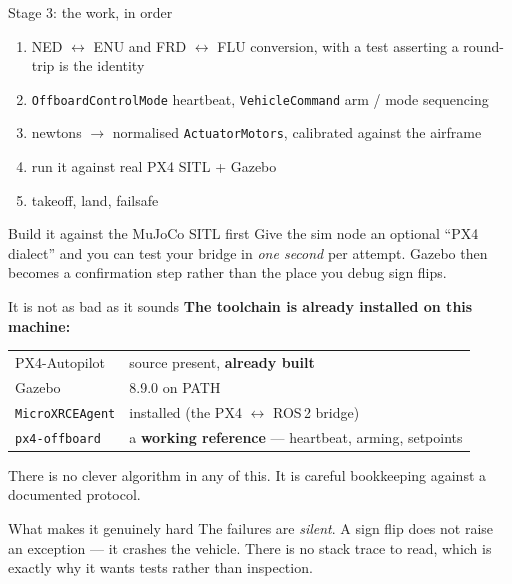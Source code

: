 \documentclass[aspectratio=169,11pt]{beamer}
\newcommand{\cue}[1]{\textbf{\color{keyc}#1}}
\begin{document}
\begin{frame}[fragile]{Stage 3: the work, in order}
  \begin{enumerate}
    \setlength{\itemsep}{0.24cm}
    \item NED $\leftrightarrow$ ENU and FRD $\leftrightarrow$ FLU conversion,
      with a test asserting a round-trip is the identity
    \item \texttt{OffboardControlMode} heartbeat, \texttt{VehicleCommand}
      arm / mode sequencing
    \item newtons $\to$ normalised \texttt{ActuatorMotors}, calibrated against
      the airframe
    \item run it against real PX4 SITL + Gazebo
    \item takeoff, land, failsafe
  \end{enumerate}

  \vspace{0.4cm}
  \begin{block}{Build it against the MuJoCo SITL first}
    {\small Give the sim node an optional ``PX4 dialect'' and you can test your
    bridge in \emph{one second} per attempt. Gazebo then becomes a confirmation
    step rather than the place you debug sign flips.}
  \end{block}
\end{frame}

\begin{frame}[fragile]{It is not as bad as it sounds}
  \cue{The toolchain is already installed on this machine:}

  \vspace{0.3cm}
  \begin{center}
  \small
  \begin{tabular}{@{}ll@{}}
    \toprule
    PX4-Autopilot & source present, \textbf{already built}\\
    Gazebo & 8.9.0 on PATH\\
    \texttt{MicroXRCEAgent} & installed (the PX4 $\leftrightarrow$ ROS\,2 bridge)\\
    \texttt{px4-offboard} & a \textbf{working reference} --- heartbeat, arming,
      setpoints\\
    \bottomrule
  \end{tabular}
  \end{center}

  \vspace{0.4cm}
  {\small There is no clever algorithm in any of this. It is careful bookkeeping
  against a documented protocol.}

  \vspace{0.25cm}
  \begin{alertblock}{What makes it genuinely hard}
    {\small The failures are \emph{silent}. A sign flip does not raise an
    exception --- it crashes the vehicle. There is no stack trace to read, which
    is exactly why it wants tests rather than inspection.}
  \end{alertblock}
\end{frame}
\end{document}
